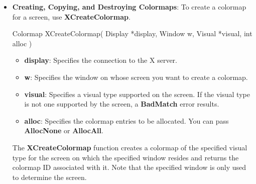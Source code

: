 \documentclass{report}
\begin{document}
\begin{itemize}
            \bigbreak \noindent 
            Xcms functions in which gamut mapping can occur return \textbf{Status} and have specific status values defined for them, as follows:
            \begin{itemize}
                \item \textbf{XcmsFailure} indicates that the function failed.
                \item \textbf{XcmsSuccess} indicates that the function succeeded. In addition, if the function performed any color conversion, the colors did not need to be compressed.
                \item \textbf{XcmsSuccessWithCompression} indicates the function performed color conversion and at least one of the colors needed to be compressed. The gamut compression method is determined by the gamut compression procedure in the CCC that is specified directly as a function argument or in the CCC indirectly specified by means of the colormap argument.
            \end{itemize}
        \item \textbf{Creating, Copying, and Destroying Colormaps}: 
            \bigbreak \noindent
            To create a colormap for a screen, use \textbf{XCreateColormap}.
            \bigbreak \noindent
            \begin{cppcode}
                Colormap XCreateColormap(
                    Display *display,
                    Window w,
                    Visual *visual,
                    int alloc
                )
            \end{cppcode}
            \bigbreak \noindent
            \begin{itemize}
                \item \textbf{display}: Specifies the connection to the X server.
                \item \textbf{w}: Specifies the window on whose screen you want to create a colormap.
                \item \textbf{visual}: Specifies a visual type supported on the screen. If the visual type is not one supported by the screen, a \textbf{BadMatch} error results.
                \item \textbf{alloc}: Specifies the colormap entries to be allocated. You can pass \textbf{AllocNone} or \textbf{AllocAll}.
            \end{itemize}
            \bigbreak \noindent
            The \textbf{XCreateColormap} function creates a colormap of the specified visual type for the screen on which the specified window resides and returns the colormap ID associated with it. Note that the specified window is only used to determine the screen.

\end{itemize}
\end{document}
